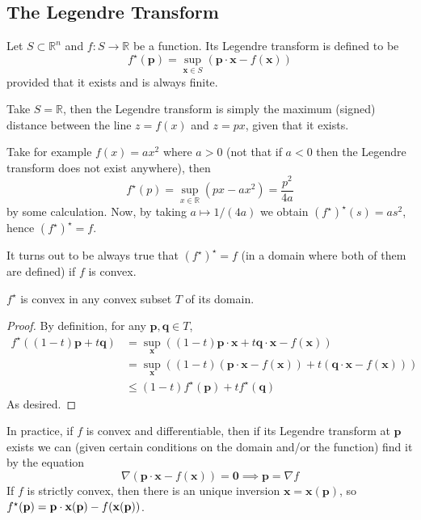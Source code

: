\documentclass{article}
\begin{document}
\subsection{The Legendre Transform}
\begin{definition}
    Let $S\subset\mathbb R^n$ and $f:S\to\mathbb R$ be a function.
    Its Legendre transform is defined to be
    $$f^\star(\mathbf{p})=\sup_{\mathbf{x}\in S}(\mathbf{p}\cdot\mathbf{x}-f(\mathbf{x}))$$
    provided that it exists and is always finite.
\end{definition}
\begin{example}
    Take $S=\mathbb R$, then the Legendre transform is simply the maximum (signed) distance between the line $z=f(x)$ and $z=px$, given that it exists.

    Take for example $f(x)=ax^2$ where $a>0$ (not that if $a<0$ then the Legendre transform does not exist anywhere), then
    $$f^\star(p)=\sup_{x\in\mathbb R}(px-ax^2)=\frac{p^2}{4a}$$
    by some calculation.
    Now, by taking $a\mapsto 1/(4a)$ we obtain $(f^\star)^\star(s)=as^2$, hence $(f^\star)^\star=f$.
\end{example}
It turns out to be always true that $(f^\star)^\star=f$ (in a domain where both of them are defined) if $f$ is convex.
\begin{proposition}
    $f^\star$ is convex in any convex subset $T$ of its domain.
\end{proposition}
\begin{proof}
    By definition, for any $\mathbf{p},\mathbf{q}\in T$,
    \begin{align*}
        f^\star((1-t)\mathbf{p}+t\mathbf{q})&=\sup_{\mathbf{x}}((1-t)\mathbf{p}\cdot\mathbf{x}+t\mathbf{q}\cdot\mathbf{x}-f(\mathbf{x}))\\
        &=\sup_{\mathbf{x}}((1-t)(\mathbf{p}\cdot\mathbf{x}-f(\mathbf{x}))+t(\mathbf{q}\cdot\mathbf{x}-f(\mathbf{x})))\\
        &\le (1-t)f^{\star}(\mathbf{p})+tf^\star(\mathbf{q})
    \end{align*}
    As desired.
\end{proof}
In practice, if $f$ is convex and differentiable, then if its Legendre transform at $\mathbf{p}$ exists we can (given certain conditions on the domain and/or the function) find it by the equation
$$\nabla(\mathbf{p}\cdot\mathbf{x}-f(\mathbf{x}))=\mathbf{0}\implies \mathbf{p}=\nabla f$$
If $f$ is strictly convex, then there is an unique inversion $\mathbf{x}=\mathbf{x}(\mathbf{p})$, so $f^\star({\bf p})=\mathbf{p}\cdot\mathbf{x}(\mathbf{p})-f(\mathbf{x}(\mathbf{p}))$.
\newpage
\end{document}
